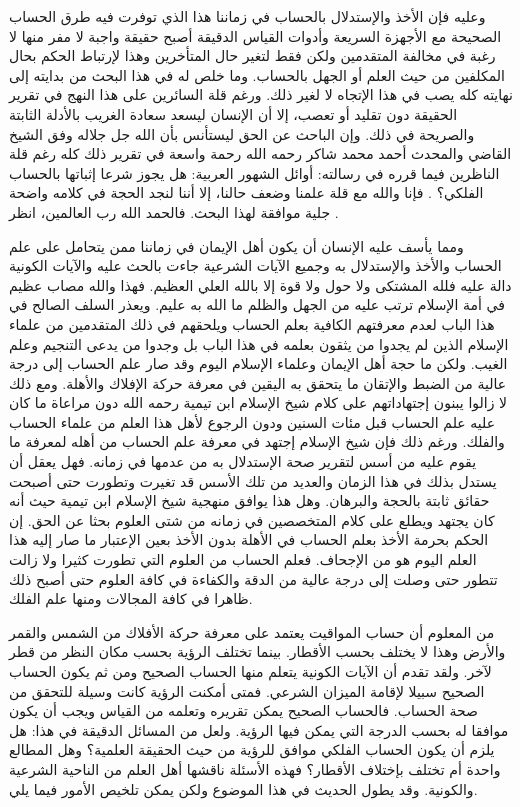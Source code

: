 وعليه فإن الأخذ والإستدلال بالحساب في زماننا هذا الذي توفرت فيه طرق الحساب الصحيحة مع الأجهزة السريعة وأدوات القياس الدقيقة أصبح حقيقة واجبة لا مفر منها لا رغبة في مخالفة المتقدمين ولكن فقط لتغير حال المتأخرين وهذا لإرتباط الحكم بحال المكلفين من حيث العلم أو الجهل بالحساب. وما خلص له في هذا البحث من بدايته إلى نهايته كله يصب في هذا الإتجاه لا لغير ذلك. ورغم قلة السائرين على هذا النهج في تقرير الحقيقة دون تقليد أو تعصب، إلا أن الإنسان ليسعد سعادة الغريب بالأدلة الثابتة والصريحة في ذلك. وإن الباحث عن الحق ليستأنس بأن الله جل جلاله وفق الشيخ القاضي والمحدث أحمد محمد شاكر رحمه الله رحمة واسعة في تقرير ذلك كله رغم قلة الناظرين فيما قرره في رسالته: أوائل الشهور العربية: هل يجوز شرعا إثباتها بالحساب الفلكي؟ \cite{shuhur_ahmidShakir}. فإنا والله مع قلة علمنا وضعف حالنا، إلا أننا  لنجد الحجة في كلامه واضحة جلية موافقة لهذا البحث. فالحمد الله رب العالمين، انظر .

ومما يأسف عليه الإنسان أن يكون أهل الإيمان في زماننا ممن يتحامل على علم الحساب والأخذ والإستدلال به وجميع الآيات الشرعية جاءت بالحث عليه والآيات الكونية دالة عليه فلله المشتكى ولا حول ولا قوة إلا بالله العلي العظيم. فهذا والله مصاب عظيم في أمة الإسلام ترتب عليه من الجهل والظلم ما الله به عليم. ويعذر السلف الصالح في هذا الباب لعدم معرفتهم الكافية بعلم الحساب ويلحقهم في ذلك المتقدمين من علماء الإسلام الذين لم يجدوا من يثقون بعلمه في هذا الباب بل وجدوا من يدعى التنجيم وعلم الغيب. ولكن ما حجة أهل الإيمان وعلماء الإسلام اليوم وقد صار علم الحساب إلى درجة عالية من الضبط والإتقان ما يتحقق به اليقين في معرفة حركة الإفلاك والأهلة. ومع ذلك لا زالوا يبنون إجتهاداتهم على كلام شيخ الإسلام ابن تيمية رحمه الله دون مراعاة ما كان عليه علم الحساب قبل مئات السنين ودون الرجوع لأهل هذا العلم من علماء الحساب والفلك. ورغم ذلك فإن شيخ الإسلام إجتهد في معرفة علم الحساب من أهله لمعرفة ما يقوم عليه من أسس لتقرير صحة الإستدلال به من عدمها في زمانه. فهل يعقل أن يستدل بذلك في هذا الزمان والعديد من تلك الأسس قد تغيرت وتطورت حتى أصبحت حقائق ثابتة بالحجة والبرهان. وهل هذا يوافق منهجية شيخ الإسلام ابن تيمية حيث أنه كان يجتهد ويطلع على كلام المتخصصين في زمانه من شتى العلوم بحثا عن الحق. إن الحكم بحرمة الأخذ بعلم الحساب في الأهلة بدون الأخذ بعين الإعتبار ما صار إليه هذا العلم اليوم هو من الإجحاف. فعلم الحساب من العلوم التي تطورت كثيرا ولا زالت تتطور حتى وصلت إلى درجة عالية من الدقة والكفاءة في كافة العلوم حتى أصبح ذلك ظاهرا في كافة المجالات ومنها علم الفلك.

من المعلوم أن حساب المواقيت يعتمد على معرفة حركة الأفلاك من الشمس والقمر والأرض وهذا لا يختلف بحسب الأقطار. بينما تختلف الرؤية بحسب مكان النظر من قطر لآخر. ولقد تقدم أن الآيات الكونية يتعلم منها الحساب الصحيح ومن ثم يكون الحساب الصحيح سبيلا لإقامة الميزان الشرعي. فمتى أمكنت الرؤية كانت وسيلة للتحقق من صحة الحساب. فالحساب الصحيح يمكن تقريره وتعلمه من القياس ويجب أن يكون موافقا له بحسب الدرجة التي يمكن فيها الرؤية. ولعل من المسائل الدقيقة في هذا: هل يلزم أن يكون الحساب الفلكي موافق للرؤية من حيث الحقيقة العلمية؟ وهل المطالع واحدة أم تختلف بإختلاف الأقطار؟ فهذه الأسئلة ناقشها أهل العلم من الناحية الشرعية والكونية. وقد يطول الحديث في هذا الموضوع ولكن يمكن تلخيص الأمور فيما يلي.

